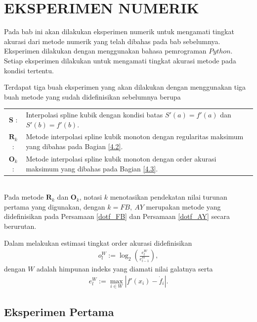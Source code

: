 \chapter{EKSPERIMEN NUMERIK}

Pada bab ini akan dilakukan eksperimen numerik untuk mengamati tingkat akurasi dari metode numerik yang telah dibahas pada bab sebelumnya. Eksperimen dilakukan dengan menggunakan bahasa pemrograman $Python$. Setiap eksperimen dilakukan untuk mengamati tingkat akurasi metode pada kondisi tertentu.

Terdapat tiga buah eksperimen yang akan dilakukan dengan menggunakan tiga buah metode yang sudah didefinisikan sebelumnya berupa

\begin{tabular}{cp{10.5cm}}
  $\textbf{S}$  :& Interpolasi spline kubik dengan kondisi batas $S'(a) = f'(a)$ dan $S'(b) = f'(b)$.\\
  $\textbf{R}_k$  :& Metode interpolasi spline kubik monoton dengan regularitas maksimum yang dibahas pada Bagian \ref{4.2}.\\
  $\textbf{O}_k$  :& Metode interpolasi spline kubik monoton dengan order akurasi maksimum yang dibahas pada Bagian \ref{4.3}.\\
\end{tabular}\\
Pada metode $\textbf{R}_k$ dan $\textbf{O}_k$, notasi $k$ menotasikan pendekatan nilai turunan pertama yang digunakan, dengan $k = FB,~AY$ merupakan metode yang didefinisikan pada Persamaan \eqref{dotf_FB} dan Persamaan \eqref{dotf_AY} secara berurutan.

Dalam melakukan estimasi tingkat order akurasi didefinisikan
\begin{align*}
    o_l^W := \log_2(\frac{e_l^W}{e_{l-1}^W}),
\end{align*}
dengan $W$ adalah himpunan indeks yang diamati nilai galatnya serta
\begin{align*}
    e_l^W := \max_{i \in W} |f'(x_i) - \dot{f}_i|.
\end{align*}

\section{Eksperimen Pertama}

